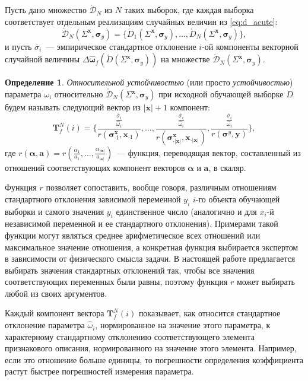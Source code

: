\documentclass[11pt,a4paper]{article}
\theoremstyle{definition}
\newtheorem{defin}{Определение}
\begin{document}
Пусть дано множество $\acute{\mathcal{D}}_N$ из $N$ таких выборок, где каждая выборка
соответствует отдельным реализациям случайных величин из \eqref{eq:d_acute}:
\[
  \acute{\mathcal{D}}_N (\Sigma^{\mathbf{x}}, \boldsymbol{\sigma}_y) = \{ \acute{D}_1 (\Sigma^{\mathbf{x}}, \boldsymbol{\sigma}_y), \dots, \acute{D}_N (\Sigma^{\mathbf{x}}, \boldsymbol{\sigma}_y) \},
\]
и пусть $\overline{\sigma}_i$~--- эмпирическое стандартное отклонение $i$-ой компоненты
векторной случайной величины
$\Delta\hat{\boldsymbol{\omega}}_f(\acute{D} (\Sigma^{\mathbf{x}}, \boldsymbol{\sigma}_y) )$
на множестве $\acute{\mathcal{D}}_N (\Sigma^{\mathbf{x}}, \boldsymbol{\sigma}_y)$.
\begin{defin}
\emph{Относительной устойчивостью} (или просто \emph{устойчивостью}) параметра
$\omega_i$ относительно $\acute{\mathcal{D}}_N (\Sigma^{\mathbf{x}}, \boldsymbol{\sigma}_y)$
при исходной обучающей выборке $D$ будем называть следующий вектор
из $| \mathbf{x} | + 1$ компонент:
\begin{equation}
  \mathbf{T}^N_f(i) = \Big\{ \frac{\frac{\overline{\sigma}_i}{\hat{\omega}_i}}{r(\boldsymbol{\sigma}^\mathbf{x}_{\cdot 1}, \mathbf{x}_{\cdot 1})}, \dots, \frac{\frac{\overline{\sigma}_i}{\hat{\omega}_i}}{r(\boldsymbol{\sigma}^\mathbf{x}_{\cdot |\mathbf{x}|}, \mathbf{x}_{\cdot |\mathbf{x}|})}, \frac{\frac{\overline{\sigma}_i}{\hat{\omega}_i}}{r(\boldsymbol{\sigma}^y, \mathbf{y})} \Big\},
  \label{eq:t_rel}
\end{equation}
где $r(\boldsymbol{\alpha}, \mathbf{a}) = r(\frac{\alpha_1}{a_1}, \dots, \frac{\alpha_{|\boldsymbol{\alpha}|}}{a_{|\mathbf{a}|}})$~---
функция, переводящая вектор, составленный из отношений соответствующих компонент векторов $\boldsymbol{\alpha}$ и $\mathbf{a}$, в скаляр.
\end{defin}

Функция $r$ позволяет сопоставить, вообще говоря, различным отношениям стандартного
отклонения зависимой переменной $y_i$ $i$-го объекта обучающей выборки и самого значения $y_i$
единственное число (аналогично и для $x_i$-й независимой переменной и ее стандартного отклонения).
Примерами такой функции могут являться среднее арифметическое
всех отношений или максимальное значение отношения, а конкретная функция выбирается
экспертом в зависимости от физического смысла задачи.
В настоящей работе предлагается выбирать значения стандартных отклонений так, чтобы
все значения соответствующих переменных были равны, поэтому функция $r$ может выбирать
любой из своих аргументов.

Каждый компонент вектора $\mathbf{T}^N_f(i)$ показывает, как относится стандартное отклонение
параметра $\hat{\omega}_i$, нормированное на значение этого параметра, к характерному стандартному
отклонению соответствующего элемента признакового описания, нормированного на значение этого
элемента. Например, если это отношение больше единицы, то погрешности определения коэффициента
растут быстрее погрешностей измерения параметра.
\end{document}
